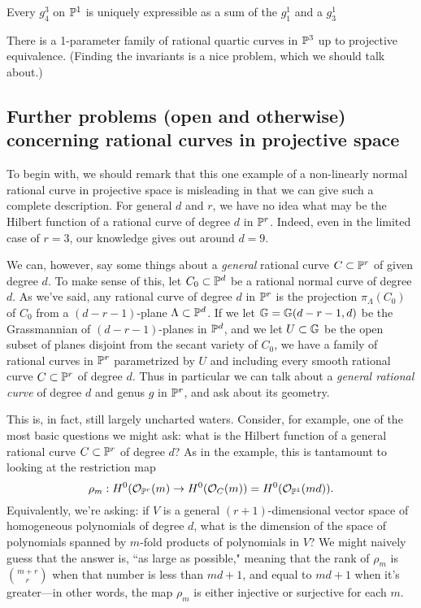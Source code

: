 \begin{exercise}
Every $g^3_4$ on ${\mathbb P}^1$ is uniquely expressible as a sum of the $g_1^1$ and a $g^1_3$
\end{exercise}

\begin{exercise}
There is a 1-parameter family of rational quartic curves in ${\mathbb P}^3$ up to projective equivalence. (Finding the invariants is a nice problem, which we should talk about.)
\end{exercise}

\subsection{Further problems (open and otherwise) concerning rational curves in projective space}

To begin with, we should remark that this one example of a non-linearly normal rational curve in projective space is misleading in that we can give such a complete description. For general $d$ and $r$, we have no idea what may be the Hilbert function of a rational curve of degree $d$ in ${\mathbb P}^r$. Indeed, even in the limited case of $r=3$, our knowledge gives out around $d=9$.

We can, however, say some things about a \emph{general} rational curve $C \subset {\mathbb P}^r$ of given degree $d$. To make sense of this, let $C_0 \subset {\mathbb P}^d$ be a rational normal curve of degree $d$. As we've said, any rational curve of degree $d$ in ${\mathbb P}^r$ is the projection $\pi_\Lambda(C_0)$ of $C_0$ from a $(d-r-1)$-plane $\Lambda \subset {\mathbb P}^d$. If we let ${\mathbb G} = {\mathbb G}(d-r-1, d)$ be the Grassmannian of $(d-r-1)$-planes in ${\mathbb P}^d$, and we let $U \subset {\mathbb G}$ be the open subset of planes disjoint from the secant variety of $C_0$, we have a family of rational curves in ${\mathbb P}^r$ parametrized by $U$ and including every smooth rational curve $C \subset {\mathbb P}^r$ of degree $d$. Thus in particular we can talk about a \emph{general rational curve} of degree $d$ and genus $g$ in ${\mathbb P}^r$, and ask about its geometry.

This is, in fact, still largely uncharted waters. Consider, for example, one of the most basic questions we might ask: what is the Hilbert function of a general rational curve $C \subset {\mathbb P}^r$ of degree $d$? As in the example, this is tantamount to looking at the restriction map
$$
\rho_m : H^0({\mathcal O}_{{\mathbb P}^r}(m) \to H^0({\mathcal O}_C(m)) = H^0({\mathcal O}_{{\mathbb P}^1}(md)).
$$
Equivalently, we're asking: if $V$ is a general  $(r+1)$-dimensional vector space of homogeneous polynomials of degree $d$, what is the dimension of the space of polynomials spanned by $m$-fold products of polynomials in $V$? We might naively guess that the answer is, ``as large as possible," meaning that the rank of $\rho_m$ is $\binom{m+r}{r}$ when that number is less than $md+1$, and equal to $md+1$ when it's greater---in other words, the map $\rho_m$ is either injective or surjective for each $m$.

